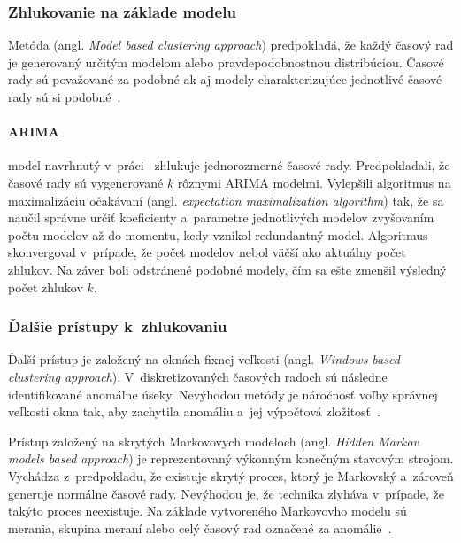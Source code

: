 \documentclass[a4paper,twoside,slovak,12pt,appendix]{article}
\begin{document}
\subsubsection{Zhlukovanie na základe modelu}
\label{c:model-clustering}
Metóda (angl. \textit{Model based clustering approach}) predpokladá, že každý
časový rad je generovaný určitým modelom alebo pravdepodobnostnou distribúciou.
Časové rady sú považované za podobné ak aj modely charakterizujúce jednotlivé
časové rady sú si podobné~\cite{Rani2012}.

\paragraph{ARIMA} model navrhnutý v~práci~\cite{Xiong2002} zhlukuje
jednorozmerné časové rady. Predpokladali, že časové rady sú vygenerované $k$
rôznymi ARIMA modelmi. Vylepšili algoritmus na maximalizáciu očakávaní (angl.
\textit{expectation maximalization algorithm}) tak, že sa naučil správne určiť
koeficienty a~parametre jednotlivých modelov zvyšovaním počtu modelov až do
momentu, kedy vznikol redundantný model. Algoritmus skonvergoval v~prípade, že
počet modelov nebol väčší ako aktuálny počet zhlukov. Na záver boli odstránené
podobné modely, čím sa ešte zmenšil výsledný počet zhlukov $k$.

\subsubsection{Ďalšie prístupy k~zhlukovaniu}
\label{c:other-clustering}
Ďalší prístup je založený na oknách fixnej veľkosti (angl. \textit{Windows based
clustering approach}). V~diskretizovaných časových radoch sú následne
identifikované anomálne úseky. Nevýhodou metódy je náročnosť voľby správnej
veľkosti okna tak, aby zachytila anomáliu a~jej výpočtová
zložitosť~\cite{Teng2010}.

Prístup založený na skrytých Markovovych modeloch (angl. \textit{Hidden Markov
models based approach}) je reprezentovaný výkonným konečným stavovým strojom.
Vychádza z~predpokladu, že existuje skrytý proces, ktorý je Markovský a~zároveň
generuje normálne časové rady. Nevýhodou je, že technika zlyháva v~prípade, že
takýto proces neexistuje. Na základe vytvoreného Markovovho modelu sú merania,
skupina meraní alebo celý časový rad označené za anomálie~\cite{Teng2010}.

\end{document}
